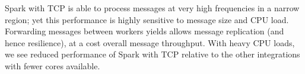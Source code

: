 \documentclass[letterpaper,conference]{IEEEtran}
\begin{document}
Spark with TCP is able to process messages at very high frequencies in a narrow region; yet this performance is highly sensitive to message size and CPU load. Forwarding messages between workers yields allows message replication (and hence resilience), at a cost overall message throughput.
With heavy CPU loads, we see reduced performance of Spark with TCP relative to the other integrations with fewer cores available. 

\end{document}
